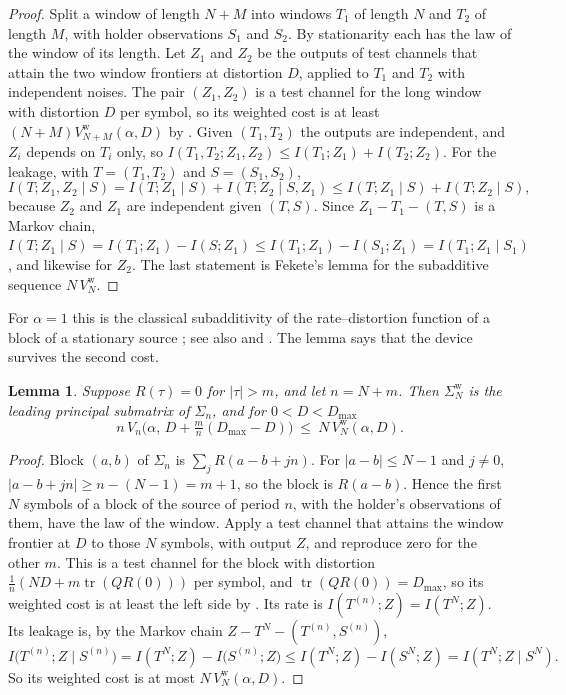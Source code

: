 \documentclass[11pt,onecolumn]{IEEEtran}
\newtheorem{lemma}[theorem]{Lemma}
\newcommand{\tr}{\operatorname{tr}}
\begin{document}
\begin{proof}
Split a window of length $N+M$ into windows $T_1$ of length $N$ and
$T_2$ of length $M$, with holder observations $S_1$ and $S_2$. By
stationarity each has the law of the window of its length. Let
$Z_1$ and $Z_2$ be the outputs of test channels that attain the two
window frontiers at distortion $D$, applied to $T_1$ and $T_2$ with
independent noises. The pair $(Z_1,Z_2)$ is a test channel for the long
window with distortion $D$ per symbol, so its weighted cost is at least
$(N+M)V^{\mathrm w}_{N+M}(\alpha,D)$ by \cite[Proposition~2]{part1}. Given
$(T_1,T_2)$ the outputs are independent, and $Z_i$ depends on $T_i$
only, so $I(T_1,T_2;Z_1,Z_2)\le I(T_1;Z_1)+I(T_2;Z_2)$. For the leakage,
with $T=(T_1,T_2)$ and $S=(S_1,S_2)$,
\[
I(T;Z_1,Z_2\mid S)=I(T;Z_1\mid S)+I(T;Z_2\mid S,Z_1)\le I(T;Z_1\mid S)+I(T;Z_2\mid S),
\]
because $Z_2$ and $Z_1$ are independent given $(T,S)$. Since $Z_1-T_1-(T,S)$ is a
Markov chain,
$I(T;Z_1\mid S)=I(T_1;Z_1)-I(S;Z_1)\le I(T_1;Z_1)-I(S_1;Z_1)=I(T_1;Z_1\mid S_1)$,
and likewise for $Z_2$. The last statement is Fekete's lemma for the
subadditive sequence $N\,V^{\mathrm w}_N$.
\end{proof}

For $\alpha=1$ this is the classical subadditivity of the
rate--distortion function of a block of a stationary source
\cite[Sec.~10.6]{gray1990eit}; see also \cite[Ch.~9]{gallager1968} and
\cite{berger1971}. The lemma says that the device survives the second
cost.

\begin{lemma}\label{lem:embed}
Suppose $R(\tau)=0$ for $|\tau|>m$, and let $n=N+m$. Then
$\Sigma^{\mathrm w}_N$ is the leading principal submatrix of $\Sigma_n$, and
for $0<D<D_{\max}$
\[
n\,V_n\bigl(\alpha,\,D+\tfrac mn(D_{\max}-D)\bigr)\ \le\ N\,V^{\mathrm w}_N(\alpha,D).
\]
\end{lemma}

\begin{proof}
Block $(a,b)$ of $\Sigma_n$ is $\sum_jR(a-b+jn)$. For $|a-b|\le N-1$ and
$j\ne0$, $|a-b+jn|\ge n-(N-1)=m+1$, so the block is $R(a-b)$. Hence
the first $N$ symbols of a block of the source of period $n$, with
the holder's observations of them, have the law of the window. Apply
a test channel that attains the window frontier at $D$ to those $N$
symbols, with output $Z$, and reproduce zero for the other $m$. This is
a test channel for the block with distortion
$\tfrac1n(ND+m\tr(QR(0)))$ per symbol, and $\tr(QR(0))=D_{\max}$, so its
weighted cost is at least the left side by
\cite[Proposition~2]{part1}. Its rate is $I(T^{(n)};Z)=I(T^N;Z)$. Its
leakage is, by the Markov chain $Z-T^N-(T^{(n)},S^{(n)})$,
\[
I\bigl(T^{(n)};Z\mid S^{(n)}\bigr)=I(T^N;Z)-I\bigl(S^{(n)};Z\bigr)\le I(T^N;Z)-I(S^N;Z)=I(T^N;Z\mid S^N).
\]
So its weighted cost is at most $N\,V^{\mathrm w}_N(\alpha,D)$.
\end{proof}
\end{document}
